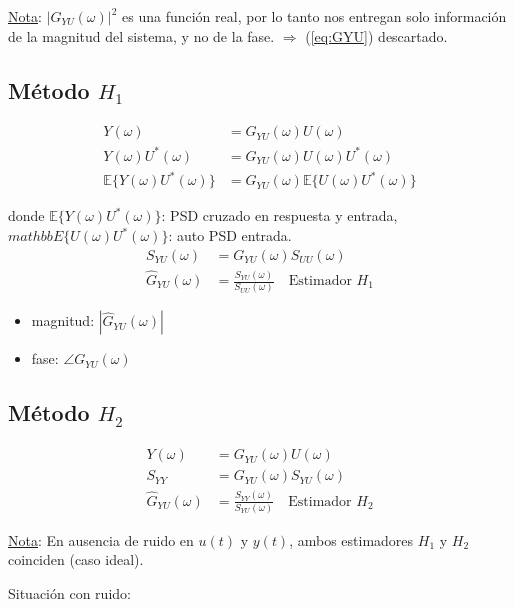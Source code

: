 \underline{Nota}: $|G_{YU}(\omega)|^2$ es una función real, por lo tanto nos entregan solo información de la magnitud del sistema, y no de la fase. $\Longrightarrow$ (\ref{eq:GYU}) descartado.


\subsection{Método $H_1$}

\begin{align*}
    Y(\omega) &= G_{YU}(\omega)U(\omega)\\
    Y(\omega)U^\ast(\omega) &= G_{YU}(\omega)U(\omega)U^\ast(\omega)\\
    \mathbb{E}\{Y(\omega)U^\ast(\omega)\} &= G_{YU}(\omega)\mathbb{E}\{U(\omega)U^\ast(\omega)\}
\end{align*}

donde $\mathbb{E}\{Y(\omega)U^\ast(\omega)\}$: PSD cruzado en respuesta y entrada,$mathbb{E}\{U(\omega)U^\ast(\omega)\}$: auto PSD entrada.
\begin{align*}
    S_{YU}(\omega) &= G_{YU}(\omega)S_{UU}(\omega)\\
    \hat{G}_{YU}(\omega) &= \frac{S_{YU}(\omega)}{S_{UU}(\omega)} \quad \text{Estimador $H_1$} 
\end{align*}

\begin{itemize}
    \item magnitud: $|\hat{G}_{YU}(\omega)|$
    \item fase: $\angle G_{YU}(\omega)$
\end{itemize}

\subsection{Método $H_2$}

\begin{align*}
    Y(\omega) &= G_{YU}(\omega)U(\omega)\\
    S_{YY} &= G_{YU}(\omega)S_{YU}(\omega)\\
    \hat{G}_{YU}(\omega) &= \frac{S_{YY}(\omega)}{S_{YU}(\omega)} \quad \text{Estimador $H_2$}
\end{align*}

\underline{Nota}: En ausencia de ruido en $u(t)$ y $y(t)$, ambos estimadores $H_1$ y $H_2$ coinciden (caso ideal).\\
\par Situación con ruido:\\

